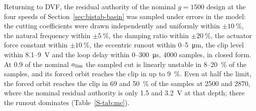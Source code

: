 \label{sec:delayed-robust}Returning to DVF, the residual authority of the nominal $g=1500$ design at the four speeds of Section~\ref{sec:bistab-basin} was sampled under errors in the model: the cutting coefficients were drawn independently and uniformly within $\pm\SI{10}{\percent}$, the natural frequency within $\pm\SI{5}{\percent}$, the damping ratio within $\pm\SI{20}{\percent}$, the actuator force constant within $\pm\SI{10}{\percent}$, the eccentric runout within 0--\SI{5}{\micro\metre}, the clip level within 8.1--\SI{9}{\volt} and the loop delay within 0--\SI{300}{\micro\second}, 4000 samples, in closed form. At $0.9$ of the nominal $a_{\lim}$ the sampled cut is linearly unstable in 8--\SI{20}{\percent} of the samples, and its forced orbit reaches the clip in up to \SI{9}{\percent}. Even at half the limit, the forced orbit reaches the clip in 69 and \SI{50}{\percent} of the samples at 2500 and \SI{2870}{\rpm}, where the nominal residual authority is only 1.5 and \SI{3.2}{\volt} at that depth; there the runout dominates (Table~\ref{S-tab:mc}).
